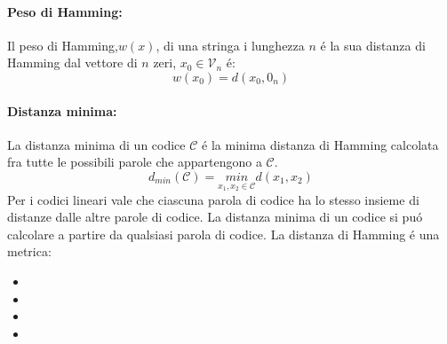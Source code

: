             \paragraph{Peso di Hamming:}\label{Peso di Hamming} Il peso di Hamming,$w(x)$, di una stringa i lunghezza $n$ é la sua distanza di Hamming dal vettore di $n$ zeri,
            $x_0\in \mathcal{V}_n$ é:
            \[
                w(x_0) = d(x_0,0_n)
            \]
            \paragraph{Distanza minima:}\label{Distanza minima}La distanza minima di un codice $\mathcal{C}$ é la minima distanza di Hamming calcolata fra tutte le possibili parole che appartengono a $\mathcal{C}$.
            \[
                d_{min} (\mathcal{C})= \underset{x_1,x_2 \in \mathcal{C}}{min}d(x_1,x_2)  
            \]
            Per i codici lineari vale che ciascuna parola di codice ha lo stesso insieme di distanze dalle altre parole di codice.
            La distanza minima di un codice si puó calcolare a partire da qualsiasi parola di codice. 
            La distanza di Hamming é una metrica:
            \begin{itemize}
                \item {}
                \item {}
                \item {}
                \item {}
            \end{itemize}

